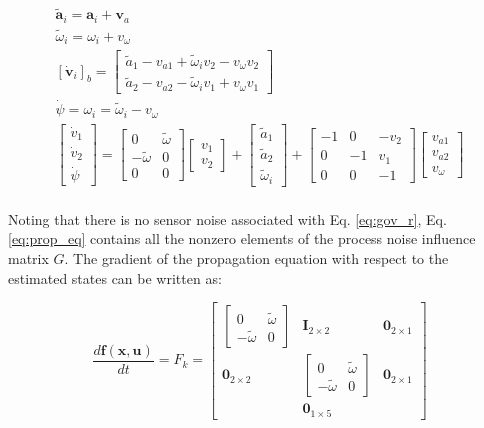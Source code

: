 \documentclass{aiaa-tc}
\newcommand{\br}[2]{[#1]_{#2}} %
\newcommand{\B}[1]{\textbf{#1}} %
\newcommand{\ddt}[1]{\frac{d#1}{dt}} %
\begin{document}
\begin{align}
\tilde{\B{a}}_i = \B{a}_i + \B{v}_a \\
\tilde{\omega}_i = \omega_i + v_\omega \\
\br{\dot{\B{v}}_i}{b} = \begin{bmatrix}
\tilde{a}_1 - v_{a1} + \tilde{\omega}_i v_{2} -  v_\omega v_2\\
\tilde{a}_2 - v_{a2} - \tilde{\omega}_i v_1 + v_\omega v_1
\end{bmatrix} \\
\dot{\psi} = \omega_i = \tilde{\omega}_i - v_\omega \\
\begin{bmatrix}
\dot{v}_1 \\ \dot{v}_2 \\ \dot{\psi}
\end{bmatrix}= \begin{bmatrix}
0 & \tilde{\omega} \\ -\tilde{\omega} & 0 \\ 0 & 0
\end{bmatrix} \begin{bmatrix}
v_1\\ v_2
\end{bmatrix} + \begin{bmatrix}
\tilde{a}_1 \\ \tilde{a}_2 \\ \tilde{\omega}_i
\end{bmatrix} + \begin{bmatrix}
-1 & 0 & -v_2 \\
0 & -1 & v_1 \\
0 & 0 & -1
\end{bmatrix} \begin{bmatrix}
v_{a1} \\ v_{a2} \\ v_\omega
\end{bmatrix} \label{eq:prop_eq} \\
\end{align}

Noting that there is no sensor noise associated with Eq. \ref{eq:gov_r}, Eq. \ref{eq:prop_eq} contains all the nonzero elements of the process noise influence matrix $G$. The gradient of the propagation equation with respect to the estimated states can be written as:

\begin{equation}
\ddt{\B{f}(\B{x},\B{u})} = F_k = \begin{bmatrix}
\begin{bmatrix}
0 & \tilde{\omega} \\ -\tilde{\omega} & 0
\end{bmatrix} & \B{I}_{2\times 2} & \B{0}_{2\times 1} \\
\B{0}_{2\times 2} & \begin{bmatrix}
0 & \tilde{\omega} \\ -\tilde{\omega} & 0
\end{bmatrix} & \B{0}_{2\times 1} \\
& \B{0}_{1 \times 5} &
\end{bmatrix}
\end{equation}
\end{document}

